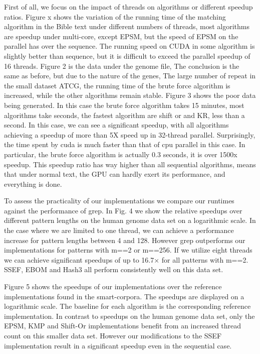 \documentclass[11pt]{article}       %
\newcommand{\includeFig}[3]      {\begin{figure}[htb] \begin{center}
                                 \includegraphics
                                 [width=4in,keepaspectratio] %
                                 {#2}\caption{\label{#1}#3} \end{center} \end{figure}}
\begin{document}
First of all, we focus on the impact of threads on algorithms or different speedup ratios. Figure x shows the variation of the running time of the matching algorithm in the Bible text under different numbers of threads, most algorithms are speedup under multi-core, except EPSM, but the speed of EPSM on the parallel has over the sequence. The running speed on CUDA in some algorithm is slightly better than sequence, but it is difficult to exceed the parallel speedup of 16 threads. Figure 2 is the data under the genome file, The conclusion is the same as before, but due to the nature of the genes, The large number of repeat in the small dataset {ATCG}, the running time of the brute force algorithm is increased, while the other algorithms remain stable. Figure 3 shows the poor data being generated. In this case the brute force algorithm takes 15 minutes, most algorithms take seconds, the fastest algorithm are shift or and KR, less than a second. In this case, we can see a significant speedup, with all algorithms achieving a speedup of more than 5X speed up in 32-thread parallel. Surprisingly, the time spent by cuda is much faster than that of cpu parallel in this case. In particular, the brute force algorithm is actually 0.3 seconds, it is over 1500x speedup. This speedup ratio has way higher than all sequential algorithms, means that under normal text, the GPU can hardly exert its performance, and everything is done.


To assess the practicality of our implementations we compare our runtimes against the performance of grep. In Fig. 4 we show the relative speedups over different pattern lengths on the human genome data set on a logarithmic scale. In the case where we are limited to one thread, we can achieve a performance increase for pattern lengths between 4 and 128. However grep outperforms our implementations for patterns with m==2 or m==256. If we utilize eight threads we can achieve significant speedups of up to 16.7× for all patterns with m==2. SSEF, EBOM and Hash3 all perform consistently well on this data set.

Figure 5 shows the speedups of our implementations over the reference implementations found in the smart-corpora. The speedups are displayed on a logarithmic scale. The baseline for each algorithm is the corresponding reference implementation. In contrast to speedups on the human genome data set, only the EPSM, KMP and Shift-Or implementations benefit from an increased thread count on this smaller data set. However our modifications to the SSEF implementation result in a significant speedup even in the sequential case.
\end{document}
